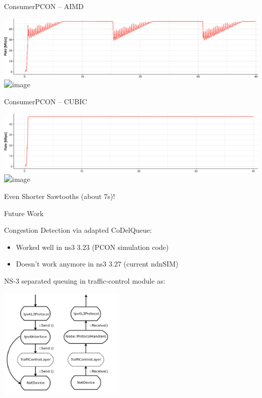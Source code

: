 \begin{frame}{ConsumerPCON -- AIMD}

\includegraphics[width=\linewidth]{figs/cons_pcon_rate.png}\\
\pause
\includegraphics<1-2>[width=\linewidth]{figs/cons_pcon_queue.png}

\end{frame}


\begin{frame}{ConsumerPCON -- CUBIC}

\includegraphics[width=\linewidth]{figs/cons_cubic_rate.png}\\
\pause
\includegraphics<1-2>[width=\linewidth]{figs/cons_cubic_queue.png}

Even Shorter Sawtooths (about 7s)!

\end{frame}


\begin{frame}{Future Work}

Congestion Detection via adapted CoDelQueue:
\begin{itemize}
\item Worked well in ns3 3.23 (PCON simulation code)
\pause
\item Doesn't work anymore in ns3 3.27 (current ndnSIM)
\end{itemize}

\pause
NS-3 separated queuing in traffic-control module as:

\centering
\includegraphics[height=150pt]{figs/ns3-queue.png}
\end{frame}


